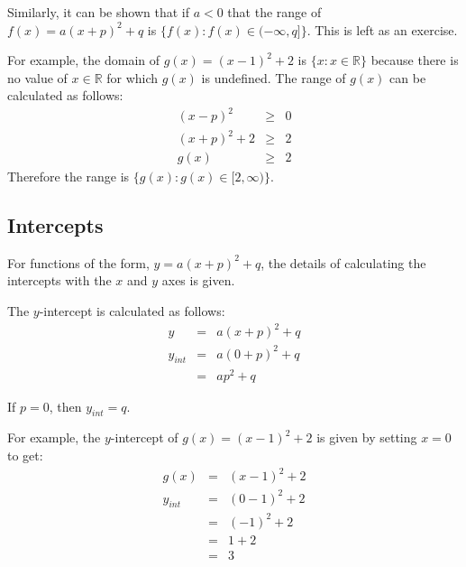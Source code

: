 Similarly, it can be shown that if $a<0$ that the range of $f(x)=a(x+p)^2+q$ is $\{f(x):f(x)\in(-\infty,q]\}$. This is left as an exercise.

For example, the domain of $g(x)=(x-1)^2 + 2$ is $\{x:x\in\mathbb{R}\}$ because there is no value of $x \in \mathbb{R}$ for which $g(x)$ is undefined. The range of $g(x)$ can be calculated as follows:
\begin{eqnarray*}
(x-p)^2&\ge& 0\\
(x+p)^2+2&\ge& 2\\
g(x) &\ge& 2
\end{eqnarray*}
Therefore the range is $\{g(x):g(x)\in[2,\infty)\}$.


\subsection{Intercepts}
For functions of the form, $y=a(x+p)^2+q$, the details of calculating the intercepts with the $x$ and $y$ axes is given.

The $y$-intercept is calculated as follows:
\begin{eqnarray}
y&=&a(x+p)^2+q\\
y_{int}&=&a(0+p)^2+q\\
&=&ap^2+q
\end{eqnarray}

If $p=0$, then $y_{int}=q$.

For example, the $y$-intercept of $g(x)=(x-1)^2 + 2$ is given by setting $x=0$ to get:
\begin{eqnarray*}
g(x)&=&(x-1)^2 + 2\\
y_{int}&=&(0-1)^2 + 2\\
&=&(-1)^2 + 2\\
&=&1 + 2\\
&=&3\\
\end{eqnarray*}

